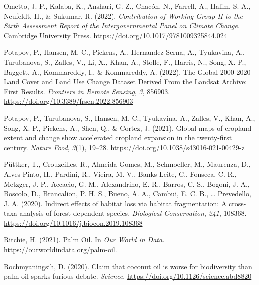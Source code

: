 \documentclass[
  letterpaper,
  DIV=11,
  numbers=noendperiod]{scrreprt}
\newlength{\cslhangindent}
\newlength{\cslentryspacingunit} %
\newenvironment{CSLReferences}[2] %
 {%
  \setlength{\parindent}{0pt}
  \ifodd #1
  \let\oldpar\par
  \def\par{\hangindent=\cslhangindent\oldpar}
  \fi
  \setlength{\parskip}{#2\cslentryspacingunit}
 }%
 {}
\begin{document}
\begin{CSLReferences}{1}{0}
\leavevmode{}%
Ometto, J. P., Kalaba, K., Anshari, G. Z., Chacón, N., Farrell, A.,
Halim, S. A., Neufeldt, H., \& Sukumar, R. (2022). \emph{Contribution of
{Working Group II} to the {Sixth Assessment Report} of the
{Intergovernmental Panel} on {Climate Change}}. {Cambridge University
Press}. \url{https://doi.org/10.1017/9781009325844.024}

\leavevmode{}%
Potapov, P., Hansen, M. C., Pickens, A., Hernandez-Serna, A., Tyukavina,
A., Turubanova, S., Zalles, V., Li, X., Khan, A., Stolle, F., Harris,
N., Song, X.-P., Baggett, A., Kommareddy, I., \& Kommareddy, A. (2022).
The {Global} 2000-2020 {Land Cover} and {Land Use Change Dataset Derived
From} the {Landsat Archive}: {First Results}. \emph{Frontiers in Remote
Sensing}, \emph{3}, 856903.
\url{https://doi.org/10.3389/frsen.2022.856903}

\leavevmode{}%
Potapov, P., Turubanova, S., Hansen, M. C., Tyukavina, A., Zalles, V.,
Khan, A., Song, X.-P., Pickens, A., Shen, Q., \& Cortez, J. (2021).
Global maps of cropland extent and change show accelerated cropland
expansion in the twenty-first century. \emph{Nature Food}, \emph{3}(1),
19--28. \url{https://doi.org/10.1038/s43016-021-00429-z}

\leavevmode{}%
Püttker, T., Crouzeilles, R., Almeida-Gomes, M., Schmoeller, M.,
Maurenza, D., Alves-Pinto, H., Pardini, R., Vieira, M. V., Banks-Leite,
C., Fonseca, C. R., Metzger, J. P., Accacio, G. M., Alexandrino, E. R.,
Barros, C. S., Bogoni, J. A., Boscolo, D., Brancalion, P. H. S., Bueno,
A. A., Cambui, E. C. B., \ldots{} Prevedello, J. A. (2020). Indirect
effects of habitat loss via habitat fragmentation: {A} cross-taxa
analysis of forest-dependent species. \emph{Biological Conservation},
\emph{241}, 108368. \url{https://doi.org/10.1016/j.biocon.2019.108368}

\leavevmode{}%
Ritchie, H. (2021). Palm {Oil}. In \emph{Our World in Data}.
https://ourworldindata.org/palm-oil.

\leavevmode{}%
Rochmyaningsih, D. (2020). Claim that coconut oil is worse for
biodiversity than palm oil sparks furious debate. \emph{Science}.
\url{https://doi.org/10.1126/science.abd8820}


\end{CSLReferences}
\end{document}
